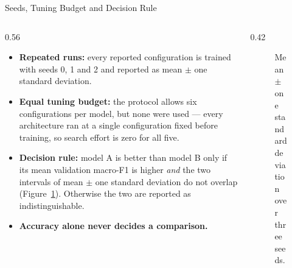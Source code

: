 \begin{frame}{Seeds, Tuning Budget and Decision Rule}
\begin{columns}[c]
\begin{column}{0.56\textwidth}
\begin{itemize}
    \item \textbf{Repeated runs:} every reported configuration is trained with seeds 0, 1 and 2 and reported as
          mean $\pm$ one standard deviation.
    \item \textbf{Equal tuning budget:} the protocol allows six configurations per model, but none were used ---
          every architecture ran at a single configuration fixed before training, so search effort is zero for all five.
    \item \textbf{Decision rule:} model A is better than model B only if its mean validation macro-F1 is higher
          \emph{and} the two intervals of mean $\pm$ one standard deviation do not overlap
          (Figure~\ref{fig:decision-rule}). Otherwise the two are reported as indistinguishable.
    \item \textbf{Accuracy alone never decides a comparison.}
\end{itemize}
\end{column}
\begin{column}{0.42\textwidth}
\begin{figure}
\centering
{}
\caption{Mean $\pm$ one standard deviation over three seeds.}
\label{fig:decision-rule}
\end{figure}
\end{column}
\end{columns}
\end{frame}

